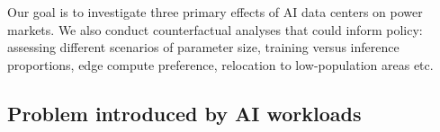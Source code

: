 \documentclass[sigconf,authordraft]{acmart}
\newcommand{\nb}[1]{\textcolor{blue}{NB[#1]}}
\begin{document}



Our goal is to investigate three primary effects of AI data centers on power markets. We also conduct counterfactual analyses that could inform policy: assessing different scenarios of parameter size, training versus inference proportions, edge compute preference, relocation to low-population areas etc.

\subsection{Problem introduced by AI workloads }

\end{document}
